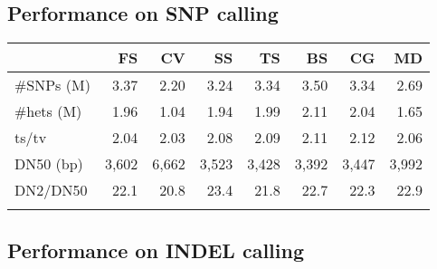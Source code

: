 \documentclass{bioinfo}
\begin{document}
\subsection{Performance on SNP calling}

\begin{table}[!htb]
{\begin{tabular}{p{1.5cm}rrrrrrr}
\toprule
& FS & CV & SS & TS & BS & CG & MD \\
\midrule
\#SNPs (M) & 3.37 & 2.20 & 3.24 & 3.34 & 3.50 & 3.34 & 2.69\\
\#hets (M) & 1.96 & 1.04 & 1.94 & 1.99 & 2.11 & 2.04 & 1.65\\
ts/tv      & 2.04 & 2.03 & 2.08 & 2.09 & 2.11 & 2.12 & 2.06\\
DN50 (bp)  & 3,602& 6,662& 3,523& 3,428& 3,392& 3,447&3,992\\
DN2/DN50   & 22.1 & 20.8 & 23.4 & 21.8 & 22.7 & 22.3 & 22.9\\
\botrule
\end{tabular}}{}
\end{table}

\subsection{Performance on INDEL calling}

\end{document}
